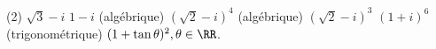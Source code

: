 %
%
	\begin{tasks}(2)
		\task $\sqrt{3} - i$
		\task $1 - i$
		\task (algébrique) $(\sqrt{2} - i)^4$
		\task (algébrique) $(\sqrt{2} - i)^3$
		\task $(1+i)^6$
		\task (trigonométrique)	$ (1 + \tan{\theta})^2, \theta \in \RR$.
	\end{tasks}
